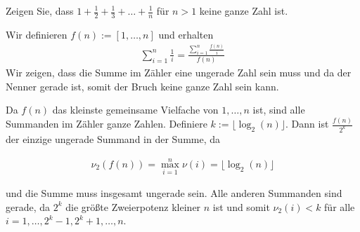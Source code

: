 
\begin{exercise}

Zeigen Sie, dass $1 + \frac{1}{2} + \frac{1}{3} + \dots + \frac{1}{n}$ für $n > 1$
keine ganze Zahl ist.

\end{exercise}


\begin{solution}
Wir definieren $f(n) := [1,\dots,n]$ und erhalten
\begin{align*}
  \sum_{i=1}^n \frac{1}{i} = \frac{\sum_{i=1}^n \frac{f(n)}{i}}{f(n)}
\end{align*}
Wir zeigen, dass die Summe im Zähler eine ungerade Zahl sein muss und 
da der Nenner gerade ist, somit der
Bruch keine ganze Zahl sein kann.

Da $f(n)$ das kleinste gemeinsame Vielfache von
$1,\dots,n$ ist, sind alle Summanden im Zähler ganze Zahlen. Definiere $k := \lfloor \log_2(n) \rfloor$.
Dann ist $\frac{f(n)}{2^k}$ der einzige ungerade Summand in der Summe, da

\begin{align*}
  \nu_2(f(n)) = \max_{i=1}^n \nu(i) =  \lfloor \log_2(n) \rfloor
\end{align*}

 und die Summe
muss insgesamt ungerade sein. Alle anderen Summanden sind gerade, da
 $2^k$ die größte Zweierpotenz kleiner $n$ ist und somit $\nu_2(i) < k$
für alle $i = 1,\dots,2^k-1,2^k+1,\dots,n$.

\end{solution}

